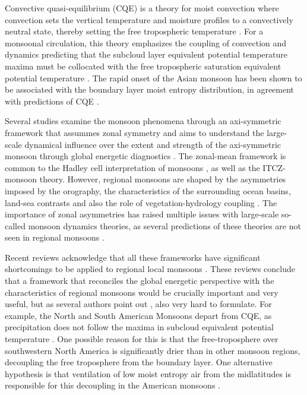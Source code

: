 Convective quasi-equilibrium (CQE) is a theory for moist convection where convection sets the vertical temperature and moisture profiles to a convectively neutral state, thereby setting the free tropospheric temperature \citep{neelin2007moist}. For a monsoonal circulation, this theory emphasizes the coupling of convection and dynamics predicting that the subcloud layer equivalent potential temperature maxima must be collocated with the free tropospheric saturation equivalent potential temperature \citep{nie2010observational,geen2020}. The rapid onset of the Asian monsoon has been shown to be associated with the boundary layer moist entropy distribution, in agreement with predictions of CQE \citep{nie2010observational,boos2015review,ma2019}.

Several studies examine the monsoon phenomena through an axi-symmetric framework that assummes zonal symmetry and aims to understand the large-scale dynamical influence over the extent and strength of the axi-symmetric monsoon through global energetic diagnostics \citep[e.g.][]{faulk2017effects,geen2019,byrne2020}. The zonal-mean framework is common to the Hadley cell interpretation of monsoons \citep{bordoni2008monsoons}, as well as the ITCZ-monsoon theory. %
However, regional monsoons are shaped by the asymmetries imposed by the orography, the characteristics of the surrounding ocean basins, land-sea contrasts and also the role of vegetation-hydrology coupling \citep{wang2017,pascale2019}. 
The importance of zonal asymmetries has raised multiple issues with large-scale so-called monsoon dynamics theories, as several predictions of these theories are not seen in regional monsoons \citep[e.g.][]{nie2010observational,smyth2018simulated,biasutti2018global,pascale2019}. 


Recent reviews acknowledge that all these frameworks have significant shortcomings to be applied to regional local monsoons \citep{biasutti2018global,hill2019,geen2020}. These reviews conclude that a framework that reconciles the global energetic perspective with the characteristics of regional monsoons would be crucially important and very useful, but as several authors point out \citep[e.g.][]{biasutti2018global,hill2019}, also very hard to formulate. For example, the North and South American Monsoons depart from CQE, as precipitation does not follow the maxima in subcloud equivalent potential temperature \citep{nie2010observational,geen2020}. One possible reason for this is that the free-troposphere over southwestern North America is significantly drier than in other monsoon regions, decoupling the free troposphere from the boundary layer. One alternative hypothesis is that ventilation of low moist entropy air from the midlatitudes is responsible for this decoupling in the American monsoons \citep{boos2015review}.

